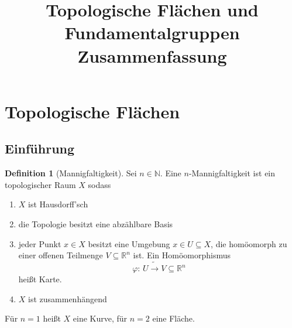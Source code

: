 \documentclass[a4paper, 12pt]{article}
\theoremstyle{plain}
\theoremstyle{definition}
\newtheorem{definition}[theorem]{Definition} %
\theoremstyle{lemma}
\theoremstyle{remark}
\theoremstyle{corollary}
\theoremstyle{example}
\begin{document}
	\begin{titlepage} 
		\title{Topologische Flächen und Fundamentalgruppen Zusammenfassung}
		\clearpage\maketitle
		\thispagestyle{empty}
	\end{titlepage}
	\tableofcontents
	\newpage
	\section{Topologische Flächen}
	\subsection{Einführung}
	\begin{definition}[Mannigfaltigkeit]
		Sei $n \in \mathbb{N}$. Eine $n$-Mannigfaltigkeit ist ein topologischer Raum $X$ sodass \begin{enumerate}
			\item $X$ ist Hausdorff'sch
			\item die Topologie besitzt eine abzählbare Basis
			\item jeder Punkt $x \in X$ besitzt eine Umgebung $x\in U\subseteq X$, die homöomorph zu einer offenen Teilmenge $V\subseteq \mathbb{R}^n$ ist. Ein Homöomorphismus \[\varphi: \, U \tilde{\rightarrow} V \subseteq \mathbb{R}^n\] heißt Karte.
			\item $X$ ist zusammenhängend
		\end{enumerate}
	\end{definition}
	Für $n=1$ heißt $X$ eine Kurve, für $n=2$ eine Fläche.
\end{document}
